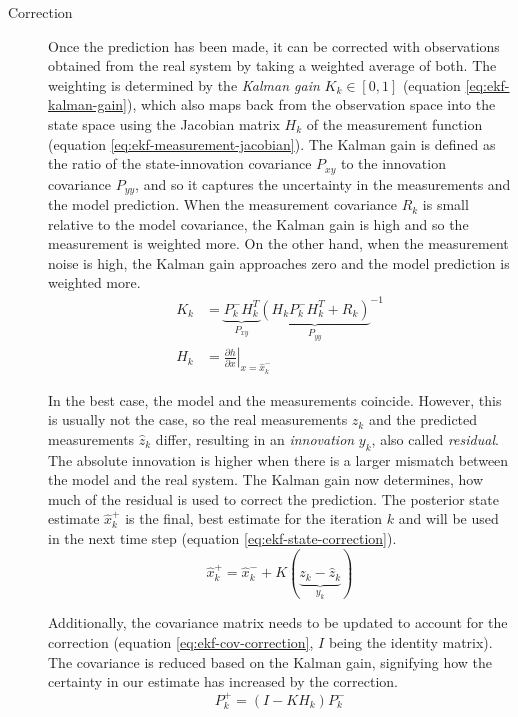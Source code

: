 \begin{description}
\item[Correction] Once the prediction has been made, it can be corrected with observations obtained from the real system by taking a weighted average of both. The weighting is determined by the \textit{Kalman gain} $K_k \in [0, 1]$ (equation \ref{eq:ekf-kalman-gain}), which also maps back from the observation space into the state space using the Jacobian matrix $H_k$ of the measurement function (equation \ref{eq:ekf-measurement-jacobian}). The Kalman gain is defined as the ratio of the state-innovation covariance $P_{xy}$ to the innovation covariance $P_{yy}$, and so it captures the uncertainty in the measurements and the model prediction. When the measurement covariance $R_k$ is small relative to the model covariance, the Kalman gain is high and so the measurement is weighted more. On the other hand, when the measurement noise is high, the Kalman gain approaches zero and the model prediction is weighted more.
\begin{align}\label{eq:ekf-kalman-gain}%
K_k &= \underbrace{P_k^- H_k^T}_\textrm{$P_{xy}$} {\underbrace{(H_k P_k^- H_k^T + R_k)}_\textrm{$P_{yy}$}}^{-1} \\%
\label{eq:ekf-measurement-jacobian}%
H_k &= \left. \frac{\partial h}{\partial x} \right|_{x = \hat{x}_{k}^-}%
\end{align}

In the best case, the model and the measurements coincide. However, this is usually not the case, so the real measurements $z_k$ and the predicted measurements $\hat{z}_k$ differ, resulting in an \textit{innovation} $y_k$, also called \textit{residual}. The absolute innovation is higher when there is a larger mismatch between the model and the real system. The Kalman gain now determines, how much of the residual is used to correct the prediction. The posterior state estimate $\hat{x}_k^+$ is the final, best estimate for the iteration $k$ and will be used in the next time step (equation \ref{eq:ekf-state-correction}).
\begin{equation}\label{eq:ekf-state-correction}%
\hat{x}_k^+ = \hat{x}_k^- + K(\underbrace{z_k - \hat{z}_k}_\textrm{$y_k$})%
\end{equation}

Additionally, the covariance matrix needs to be updated to account for the correction (equation \ref{eq:ekf-cov-correction}, $I$ being the identity matrix). The covariance is reduced based on the Kalman gain, signifying how the certainty in our estimate has increased by the correction.
\begin{equation}\label{eq:ekf-cov-correction}%
P_k^+ = (I - K H_k)P_k^-%
\end{equation}
\end{description}



